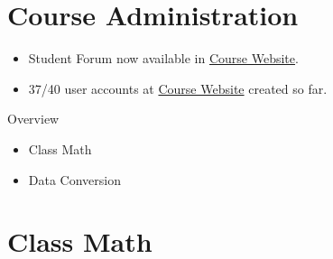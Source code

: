 \documentclass[10pt, compress]{beamer}
\begin{document}
\prepareCover

\section{Course Administration}

\begin{slide}
	\begin{itemize}
		\item[] Student Forum now available in \href{http://www.ghorbanzade.com}{Course Website}.
		\item[] 37/40 user accounts at \href{http://www.ghorbanzade.com}{Course Website} created so far.
	\end{itemize}
\end{slide}

\begin{slide}
	\begin{block}{Overview}
		\begin{itemize}
			\item[] Class Math
			\item[] Data Conversion
		\end{itemize}
	\end{block}
\end{slide}

\section{Class Math}
\end{document}
